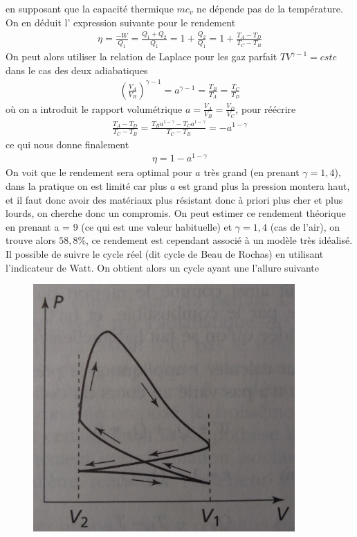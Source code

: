 \documentclass[12pt,prb,aps,epsf]{report}
\begin{document}
en supposant que la capacité thermique $mc_v$ ne dépende pas de la température. On en déduit l' expression suivante pour le rendement 
\begin{eqnarray}
\eta = \frac{-W}{Q_1} = \frac{Q_1+Q_2}{Q_1} = 1 + \frac{Q_2}{Q_1} = 1 + \frac{T_A-T_D}{T_C-T_B}
\end{eqnarray}
On peut alors utiliser la relation de Laplace pour les gaz parfait $TV^{\gamma-1}=cste$ dans le cas des deux adiabatiques 
\begin{eqnarray}
\left(\frac{V_A}{V_B}\right)^{\gamma-1} = a^{\gamma-1} = \frac{T_B}{T_A} = \frac{T_C}{T_D}
\end{eqnarray} où on a introduit le rapport volumétrique $a = \frac{V_A}{V_B} = \frac{V_D}{V_C}$, pour réécrire 
\begin{eqnarray}
\frac{T_A-T_D}{T_C-T_B} = \frac{T_B a ^{1-\gamma} - T_Ca^{1-\gamma}}{T_C-T_B} = - a^{1-\gamma}
\end{eqnarray}
ce qui nous donne finalement 
\begin{eqnarray}
\eta = 1 - a ^{1-\gamma}
\end{eqnarray}
On voit que le rendement sera optimal pour $a$ très grand (en prenant $\gamma=1,4$), dans la pratique on est limité car plus $a$ est grand plus la pression montera haut, et il faut donc avoir des matériaux plus résistant donc à priori plus cher et plus lourds, on cherche donc un compromis. On peut estimer ce rendement théorique en prenant a = 9 (ce qui est une valeur habituelle) et $\gamma = 1,4$ (cas de l'air), on trouve alors $58,8\%$, ce rendement est cependant associé à un modèle très idéalisé. Il possible de suivre le cycle réel (dit cycle de Beau de Rochas) en utilisant l'indicateur de Watt. On obtient alors un cycle ayant une l'allure suivante 
\begin{figure}[h]
	\centerline{\includegraphics[width=10cm]{cycle_beau_de_rochas}}
\end{figure}
\end{document}
